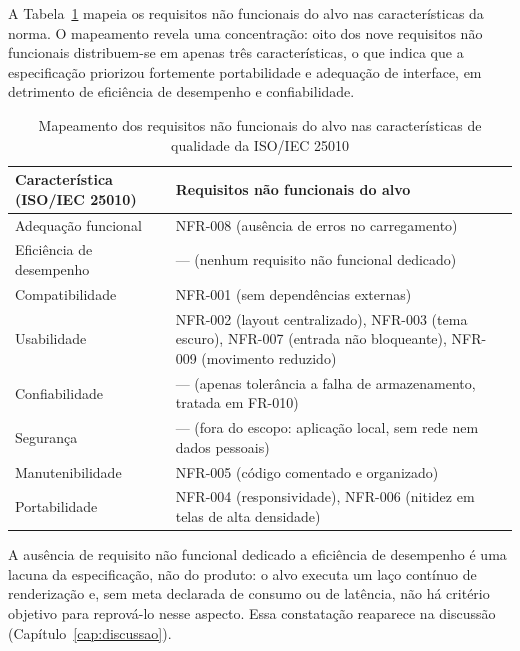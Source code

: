 A Tabela~\ref{tab:mapeamento-iso} mapeia os requisitos não funcionais do alvo nas
características da norma. O mapeamento revela uma concentração: oito dos nove
requisitos não funcionais distribuem-se em apenas três características, o que
indica que a especificação priorizou fortemente portabilidade e adequação de
interface, em detrimento de eficiência de desempenho e confiabilidade.

\begin{table}[htb]
	\caption{Mapeamento dos requisitos não funcionais do alvo nas características de qualidade da ISO/IEC 25010}
	\label{tab:mapeamento-iso}
	\centering
	\footnotesize
	\begin{tabularx}{\textwidth}{@{}p{3.6cm} X@{}}
		\toprule
		\textbf{Característica (ISO/IEC 25010)} & \textbf{Requisitos não funcionais do alvo} \\
		\midrule
		Adequação funcional & NFR-008 (ausência de erros no carregamento) \\
		\addlinespace
		Eficiência de desempenho & --- (nenhum requisito não funcional dedicado) \\
		\addlinespace
		Compatibilidade & NFR-001 (sem dependências externas) \\
		\addlinespace
		Usabilidade & NFR-002 (layout centralizado), NFR-003 (tema escuro), NFR-007 (entrada não bloqueante), NFR-009 (movimento reduzido) \\
		\addlinespace
		Confiabilidade & --- (apenas tolerância a falha de armazenamento, tratada em FR-010) \\
		\addlinespace
		Segurança & --- (fora do escopo: aplicação local, sem rede nem dados pessoais) \\
		\addlinespace
		Manutenibilidade & NFR-005 (código comentado e organizado) \\
		\addlinespace
		Portabilidade & NFR-004 (responsividade), NFR-006 (nitidez em telas de alta densidade) \\
		\bottomrule
	\end{tabularx}
\end{table}

A ausência de requisito não funcional dedicado a eficiência de desempenho é uma
lacuna da especificação, não do produto: o alvo executa um laço contínuo de
renderização e, sem meta declarada de consumo ou de latência, não há critério
objetivo para reprová-lo nesse aspecto. Essa constatação reaparece na discussão
(Capítulo~\ref{cap:discussao}).

